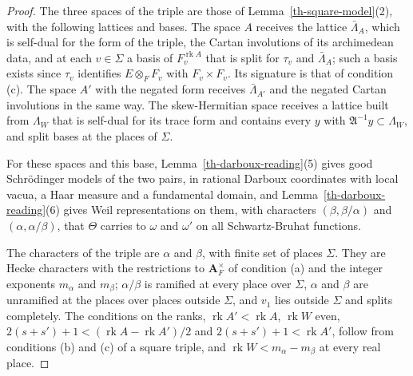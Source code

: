 \begin{proof}
The three spaces of the triple are those of Lemma~\ref{th-square-model}(2),
with the following lattices and bases. The space $A$ receives the lattice
$\bar\Lambda_A$, which is self-dual for the form of the triple, the Cartan
involutions of its archimedean data, and at each $v\in\Sigma$ a basis of
$F_v^{\operatorname{rk}A}$ that is split for $\tau_v$ and $\bar\Lambda_A$;
such a basis exists since $\tau_v$ identifies $E\otimes_FF_v$ with
$F_v\times F_v$. Its signature is that of condition (c). The space $A'$ with
the negated form receives $\bar\Lambda_{A'}$ and the negated Cartan involutions
in the same way. The skew-Hermitian space receives a lattice built from
$\Lambda_W$ that is self-dual for its trace form and contains every $y$ with
$\mathfrak A^{-1}y\subset\Lambda_W$, and split bases at the places of $\Sigma$.

For these spaces and this base, Lemma~\ref{th-darboux-reading}(5) gives good
Schrödinger models of the two pairs, in rational Darboux coordinates with
local vacua, a Haar measure and a fundamental domain, and
Lemma~\ref{th-darboux-reading}(6) gives Weil representations on them, with
characters $(\beta,\beta/\alpha)$ and $(\alpha,\alpha/\beta)$, that $\Theta$
carries to $\omega$ and $\omega'$ on all Schwartz-Bruhat functions.

The characters of the triple are $\alpha$ and $\beta$, with finite set of
places $\Sigma$. They are Hecke characters with the restrictions to
$\mathbf A_F^\times$ of condition (a) and the integer exponents $m_\alpha$ and
$m_\beta$; $\alpha/\beta$ is ramified at every place over $\Sigma$, $\alpha$ and
$\beta$ are unramified at the places over places outside $\Sigma$, and $v_1$
lies outside $\Sigma$ and splits completely. The conditions on the ranks,
$\operatorname{rk}A'<\operatorname{rk}A$, $\operatorname{rk}W$ even,
$2(s+s')+1<(\operatorname{rk}A-\operatorname{rk}A')/2$ and
$2(s+s')+1<\operatorname{rk}A'$, follow from conditions (b) and (c) of a square
triple, and $\operatorname{rk}W<m_\alpha-m_\beta$ at every real place.
\end{proof}

